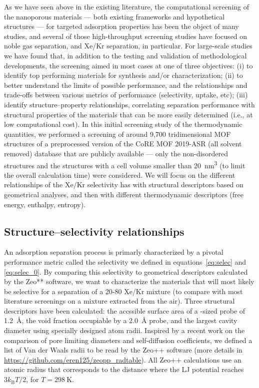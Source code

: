 \documentclass[main.tex]{subfiles}
\begin{document}
As we have seen above in the existing literature, the computational screening of the nanoporous materials --- both existing frameworks and hypothetical structures --- for targeted adsorption properties has been the object of many studies, and several of those high-throughput screening studies have focused on noble gas separation, and Xe/Kr separation, in particular. For large-scale studies we have found that, in addition to the testing and validation of methodological developments, the screening aimed in most cases at one of three objectives: (i) to identify top performing materials for synthesis and/or characterization; (ii) to better understand the limits of possible performance, and the relationships and trade-offs between various metrics of performance (selectivity, uptake, etc); (iii) identify structure--property relationships, correlating separation performance with structural properties of the materials that can be more easily determined (i.e., at low computational cost). In this initial screening study of the thermodynamic quantities, we performed a screening of around 9,700 tridimensional MOF structures of a preprocessed version of the CoRE MOF 2019-ASR (all solvent removed) database that are publicly available --- only the non-disordered structures and the structures with a cell volume smaller than \SI{20}{\nano\meter\cubed} (to limit the overall calculation time) were considered. We will focus on the different relationships of the Xe/Kr selectivity has with structural descriptors based on geometrical analyses, and then with different thermodynamic descriptors (free energy, enthalpy, entropy). 

\subsection{Structure--selectivity relationships}

An adsorption separation process is primarly characterized by a pivotal performance metric called the selectivity we defined in equations~\ref{eq:selec} and \ref{eq:selec_0}. By comparing this selectivity to geometrical descriptors calculated by the Zeo** software,\cite{Zeo++} we want to characterize the materials that will most likely be selective for a separation of a 20-80 Xe/Kr mixture (to compare with most literature screenings on a mixture extracted from the air). Three structural descriptors have been calculated: the accssible surface area of a -sized probe of \SI{1.2}{\angstrom}, the void fraction occupiable by a \SI{2.0}{\angstrom} probe,\cite{vol_Ongari2017} and the largest cavity diameter using specially designed atom radii. Inspired by a recent work on the comparison of pore limiting diameters and self-diffusion coefficients,\cite{Hung_2021} we defined a list of Van der Waals radii to be read by the Zeo++ software (more details in \url{https://github.com/eren125/zeopp_radtable}). All Zeo++ calculations use an atomic radius that corresponds to the distance where the LJ potential reaches $3 k_\text{B} T/2$, for $T = \SI{298}{\kelvin}$.
\end{document}

